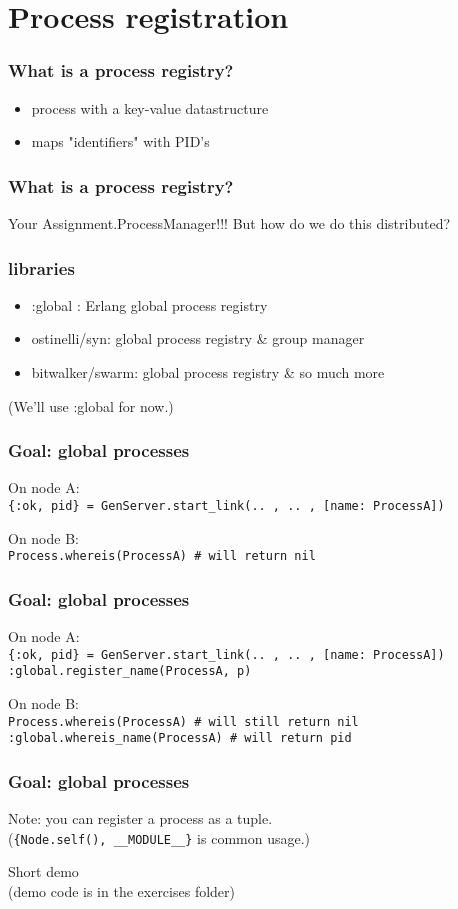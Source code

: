 \section{Process registration}

\frame{\tableofcontents[currentsection]}

\begin{frame}
    \frametitle{What is a process registry?}
    \begin{itemize}
        \item process with a key-value datastructure 
        \item maps "identifiers" with PID's
    \end{itemize}
\end{frame}

\begin{frame}
    \frametitle{What is a process registry?}
    Your Assignment.ProcessManager!!!
    \vfill
    But how do we do this distributed?
\end{frame}

\begin{frame}
    \frametitle{libraries}
    \begin{itemize}
        \item :global : Erlang global process registry
        \item ostinelli/syn: global process registry \& group manager
        \item bitwalker/swarm: global process registry \& so much more
    \end{itemize}
    
    \vfill

    (We'll use :global for now.)
\end{frame}

\begin{frame}
    \frametitle{Goal: global processes}
    On node A: \\
    \texttt{\{:ok, pid\} = GenServer.start\_link(.. , .. , [name: ProcessA])} 

    \vfill

    On node B: \\
    \texttt{Process.whereis(ProcessA) \# will return nil} 
\end{frame}

\begin{frame}
    \frametitle{Goal: global processes}
    On node A: \\
    \texttt{\{:ok, pid\} = GenServer.start\_link(.. , .. , [name: ProcessA])} \\
    \texttt{:global.register\_name(ProcessA, p)}

    \vfill

    On node B: \\
    \texttt{Process.whereis(ProcessA) \# will still return nil} \\ 
    \texttt{:global.whereis\_name(ProcessA) \# will return pid} \\ 
\end{frame}

\begin{frame}
    \frametitle{Goal: global processes}
    Note: you can register a process as a tuple. \\ 
    (\texttt{\{Node.self(), \_\_MODULE\_\_\}} is common usage.)

    \vfill

    Short demo\\
    \tiny{(demo code is in the exercises folder)}
\end{frame}